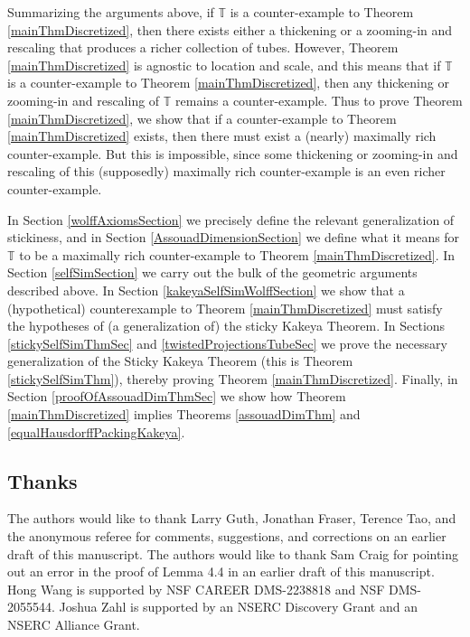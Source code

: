 \documentclass[letterpaper, reqno,11pt]{article}
\numberwithin{equation}{section}
\newcommand{\tubes}{\mathbb{T}}
\numberwithin{thm}{section}
\theoremstyle{remark}
\begin{document}
Summarizing the arguments above, if $\tubes$ is a counter-example to Theorem \ref{mainThmDiscretized}, then there exists either a thickening or a zooming-in and rescaling that produces a richer collection of tubes. However, Theorem \ref{mainThmDiscretized} is agnostic to location and scale, and this means that if $\tubes$ is a counter-example to Theorem \ref{mainThmDiscretized}, then any thickening or zooming-in and rescaling of $\tubes$ remains a counter-example. Thus to prove Theorem \ref{mainThmDiscretized}, we show that if a counter-example to Theorem \ref{mainThmDiscretized} exists, then there must exist a (nearly) maximally rich counter-example. But this is impossible, since some thickening or zooming-in and rescaling of this (supposedly) maximally rich counter-example is an even richer counter-example. 


In Section \ref{wolffAxiomsSection} we precisely define the relevant generalization of stickiness, and in Section \ref{AssouadDimensionSection} we define what it means for $\tubes$ to be a maximally rich counter-example to Theorem \ref{mainThmDiscretized}. In Section \ref{selfSimSection} we carry out the bulk of the geometric arguments described above. In Section \ref{kakeyaSelfSimWolffSection} we show that a (hypothetical) counterexample to Theorem \ref{mainThmDiscretized} must satisfy the hypotheses of (a generalization of) the sticky Kakeya Theorem. In Sections \ref{stickySelfSimThmSec} and \ref{twistedProjectionsTubeSec} we prove the necessary generalization of the Sticky Kakeya Theorem (this is Theorem \ref{stickySelfSimThm}), thereby proving Theorem \ref{mainThmDiscretized}. Finally, in Section \ref{proofOfAssouadDimThmSec} we show how Theorem \ref{mainThmDiscretized} implies Theorems \ref{assouadDimThm} and \ref{equalHausdorffPackingKakeya}.




\subsection{Thanks}
The authors would like to thank Larry Guth, Jonathan Fraser, Terence Tao, and the anonymous referee for comments, suggestions, and corrections on an earlier draft of this manuscript. The authors would like to thank Sam Craig for pointing out an error in the proof of Lemma 4.4 in an earlier draft of this manuscript. Hong Wang is supported by NSF CAREER DMS-2238818 and NSF DMS-2055544. Joshua Zahl is supported by an NSERC Discovery Grant and an NSERC Alliance Grant. 
\end{document}
